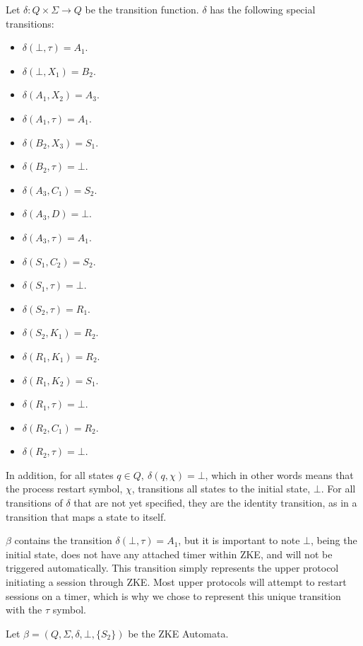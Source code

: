 \documentclass{article}
\begin{document}
\begin{definition}
	Let $\delta: Q\times\Sigma\to Q$ be the transition function. $\delta$ has the following special transitions:
	\begin{multicols}{3}
		\begin{itemize}
			\item $\delta(\bot, \tau)=A_1$.
			\item $\delta(\bot, X_1)=B_2$.
			\item $\delta(A_1, X_2)=A_3$.
			\item $\delta(A_1, \tau)=A_1$.
			\item $\delta(B_2, X_3)=S_1$.
			\item $\delta(B_2, \tau)=\bot$.
			\item $\delta(A_3, C_1)=S_2$.
			\item $\delta(A_3, D)=\bot$.
			\item $\delta(A_3, \tau)=A_1$.
			\item $\delta(S_1, C_2)=S_2$.
			\item $\delta(S_1, \tau)=\bot$.
			\item $\delta(S_2, \tau)=R_1$.
			\item $\delta(S_2, K_1)=R_2$.
			\item $\delta(R_1, K_1)=R_2$.
			\item $\delta(R_1, K_2)=S_1$.
			\item $\delta(R_1, \tau)=\bot$.
			\item $\delta(R_2, C_1)=R_2$.
			\item $\delta(R_2, \tau)=\bot$.
		\end{itemize}
	\end{multicols}
	In addition, for all states $q\in Q,\ \delta(q, \chi) = \bot$, which in other words means that the process restart symbol, $\chi$, transitions all states to the initial state, $\bot$.
	For all transitions of $\delta$ that are not yet specified, they are the identity transition, as in a transition that maps a state to itself.

	$\beta$ contains the transition $\delta(\bot, \tau)=A_1$, but it is important to note $\bot$, being the initial state, does not have any attached timer within ZKE, and will not be triggered automatically. This transition simply represents the upper protocol initiating a session through ZKE. Most upper protocols will attempt to restart sessions on a timer, which is why we chose to represent this unique transition with the $\tau$ symbol.

	Let $\beta=(Q, \Sigma, \delta, \bot, \{S_2\})$ be the ZKE Automata.
\end{definition}
\end{document}
